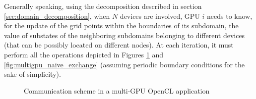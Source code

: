 Generally speaking, using the decomposition described in section \ref{sec:domain_decomposition}, when $N$ devices are involved, GPU $i$ needs to know, for the update of the grid points within the boundaries of its subdomain, the value of substates of the neighboring subdomains belonging to different devices (that can be possibly located on different nodes). 
At each iteration, it must perform all the operations depicted in Figures \ref{fig:communication_scheme} and \ref{fig:multigpu_naive_exchange} (assuming periodic boundary conditions for the sake of simplicity).
\begin{figure}[H]
\caption{Communication scheme in a multi-GPU OpenCL application}
\label{fig:communication_scheme}
\end{figure}


